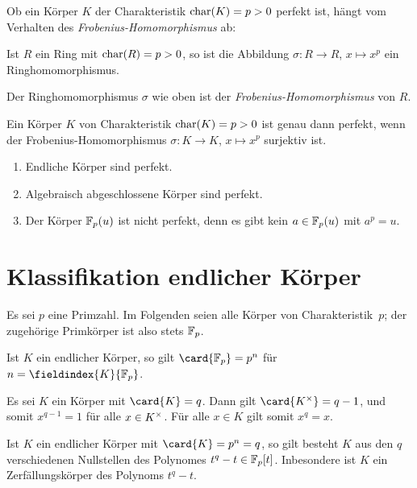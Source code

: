 Ob ein Körper $K$ der Charakteristik $\operatorname{char}(K) = p > 0$ perfekt ist, hängt vom Verhalten des \emph{Frobenius-Homomorphismus} ab:

\begin{lemma}
  Ist $R$ ein Ring mit $\operatorname{char}(R) = p > 0$, so ist die Abbildung $\sigma \colon R \to R$, $x \mapsto x^p$ ein Ringhomomorphismus.
\end{lemma}

\begin{definition}
  Der Ringhomomorphismus $\sigma$ wie oben ist der \emph{Frobenius-Homo\-mor\-phis\-mus} von $R$.
\end{definition}

\begin{proposition}
  Ein Körper $K$ von Charakteristik $\operatorname{char}(K) = p > 0$ ist genau dann perfekt, wenn der Frobenius-Homomorphismus $\sigma \colon K \to K$, $x \mapsto x^p$ surjektiv ist.
\end{proposition}

\begin{example}
  \begin{enumerate}
    \item
      Endliche Körper sind perfekt.
    \item
      Algebraisch abgeschlossene Körper sind perfekt.
    \item
      Der Körper $\mathbb{F}_p(u)$ ist nicht perfekt, denn es gibt kein $a \in \mathbb{F}_p(u)$ mit $a^p = u$.
  \end{enumerate}
\end{example}




\section{Klassifikation endlicher Körper}

Es sei $p$ eine Primzahl.
Im Folgenden seien alle Körper von Charakteristik~$p$;
der zugehörige Primkörper ist also stets $\mathbb{F}_p$.

\begin{lemma}
  Ist $K$ ein endlicher Körper, so gilt $\card{\Finite_p} = p^n$ für $n = \fieldindex{K}{\Finite_p}$.
\end{lemma}

Es sei $K$ ein Körper mit $\card{K} = q$.
Dann gilt $\card{\unitgroup{K}} = q-1$, und somit $x^{q-1} = 1$ für alle $x \in K^{\times}$.
Für alle $x \in K$ gilt somit $x^q = x$.

\begin{lemma}
  Ist $K$ ein endlicher Körper mit $\card{K} = p^n = q$, so gilt besteht $K$ aus den $q$ verschiedenen Nullstellen des Polynomes $t^q - t \in \mathbb{F}_p[t]$.
  Inbesondere ist $K$ ein Zerfällungskörper des Polynoms $t^q - t$.
\end{lemma}


